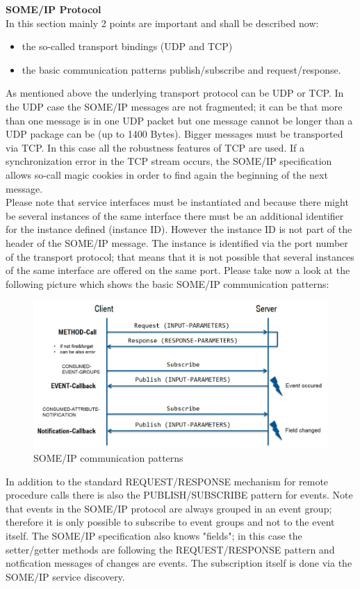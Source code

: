 \documentclass{fisattraining}
\begin{document}
\textbf{SOME/IP Protocol}\\
In this section mainly 2 points are important and shall be described now:
\begin{itemize}
\item the so-called transport bindings (UDP and TCP)
\item the basic communication patterns publish/subscribe and request/response.
\end{itemize}
As mentioned above the underlying transport protocol can be UDP or TCP. In the UDP case the SOME/IP messages are not fragmented; it can be that more than one message is in one UDP packet but one message cannot be longer than a UDP package can be (up to 1400 Bytes). Bigger messages must be transported via TCP. In this case all the robustness features of TCP are used. If a synchronization error in the TCP stream occurs, the SOME/IP specification allows so-call magic cookies in order to find again the beginning of the next message.\\
Please note that service interfaces must be instantiated and because there might be several instances of the same interface there must be an additional identifier for the instance defined (instance ID). However the instance ID is not part of the header of the SOME/IP message. The instance is identified via the port number of the transport protocol; that means that it is not possible that several instances of the same interface are offered on the same port.
Please take now a look at the following picture which shows the basic SOME/IP communication patterns:
\begin{figure}[h!]
\begin{center}
\includegraphics[scale=.5]{SOMEIPProtocol}
\caption{SOME/IP communication patterns}
\end{center}
\end{figure}
In addition to the standard REQUEST/RESPONSE mechanism for remote procedure calls there is also the PUBLISH/SUBSCRIBE pattern for events. Note that events in the SOME/IP protocol are always grouped in an event group; therefore it is only possible to subscribe to event groups and not to the event itself. The SOME/IP specification also knows "fields"; in this case the setter/getter methods are following the REQUEST/RESPONSE pattern and notfication messages of changes are events. The subscription itself is done via the SOME/IP service discovery.\\
\end{document}
